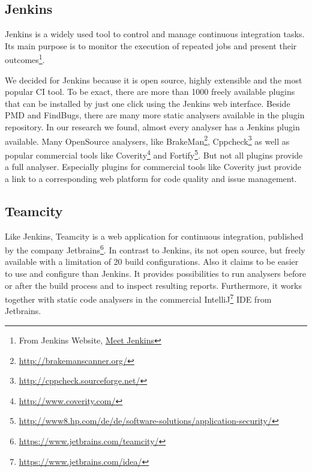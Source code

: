 \documentclass[conference]{IEEEtran}
\begin{document}
\subsection{Jenkins}
\label{subsec:jenkins}
Jenkins is a widely used tool to control and manage continuous integration tasks. Its main purpose is to monitor the execution of repeated jobs and present their outcomes\footnote{From Jenkins Website, \href{https://wiki.jenkins-ci.org/display/JENKINS/Meet+Jenkins}{Meet Jenkins}}.

We decided for Jenkins because it is open source, highly extensible and the most popular CI tool. To be exact, there are more than 1000 freely available plugins that can be installed by just one click using the Jenkins web interface.
Beside PMD and FindBugs, there are many more static analysers available in the plugin repository.
In our research we found, almost every analyser has a Jenkins plugin available.
Many OpenSource analysers, like BrakeMan\footnote{\href{http://brakemanscanner.org/}{http://brakemanscanner.org/}}, Cppcheck\footnote{\href{http://cppcheck.sourceforge.net/}{http://cppcheck.sourceforge.net/}} as well as popular commercial tools like Coverity\footnote{\href{http://www.coverity.com/}{http://www.coverity.com/}} and Fortify\footnote{\href{http://www8.hp.com/de/de/software-solutions/application-security/}{http://www8.hp.com/de/de/software-solutions/application-security/}}.
But not all plugins provide a full analyser.
Especially plugins for commercial tools like Coverity just provide a link to a corresponding web platform for code quality and issue management. 




\subsection{Teamcity}
\label{subsec:teamcity}
Like Jenkins, Teamcity is a web application for continuous integration, published by the company Jetbrains\footnote{\href{https://www.jetbrains.com/teamcity/}{https://www.jetbrains.com/teamcity/}}. In contrast to Jenkins, its not open source, but freely available with a limitation of 20 build configurations.
Also it claims to be easier to use and configure than Jenkins.
It provides possibilities to run analysers before or after the build process and to inspect resulting reports.
Furthermore, it works together with static code analysers in the commercial IntelliJ\footnote{\href{https://www.jetbrains.com/idea/}{https://www.jetbrains.com/idea/}} IDE from Jetbrains.
\end{document}

